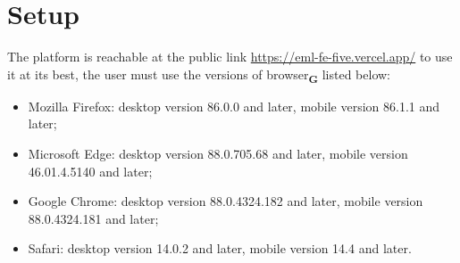\section{Setup}
The platform is reachable at the public link \href{https://eml-fe-five.vercel.app/}{https://eml-fe-five.vercel.app/}
to use it at its best, the user must use the versions of browser\textsubscript{\textbf{G}} listed below:
\begin{itemize}
    \item Mozilla Firefox: desktop version 86.0.0 and later, mobile version 86.1.1 and later;
    \item Microsoft Edge: desktop version 88.0.705.68 and later, mobile version
          46.01.4.5140 and later;
    \item Google Chrome: desktop version 88.0.4324.182 and later, mobile version
          88.0.4324.181 and later;
    \item Safari: desktop version 14.0.2 and later, mobile version 14.4 and later.
\end{itemize}